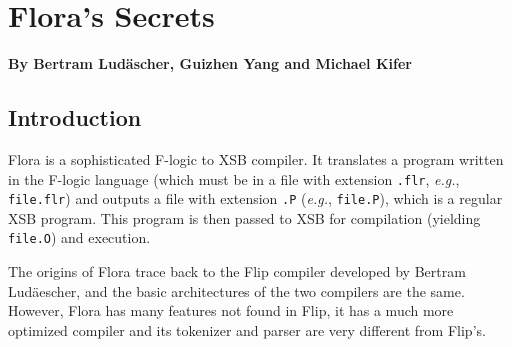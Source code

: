 \documentclass[11pt]{report}
\begin{document}
\newcommand{\FdConstr}{\ensuremath{\stackrel{constr}{\Fd}}}
\newcommand{\MvdConstr}{\ensuremath{\stackrel{constr}{\Mvd}}}

\newlength{\flogicindent}


\newlength{\flength}
\newlength{\counterlength}


\newcommand{\la}{\ensuremath{\,\leftarrow\,}}

\newcommand{\anon}{\_}

\newcommand{\note}[1]{\textit{[[#1]]}}
\newcommand{\nterm}[1]{\ensuremath{\langle}\textit{#1}\ensuremath{\rangle}}



\newcommand{\bs}{\ensuremath{\backslash}}
\newcommand{\FLIP}{{\mbox{\sc Flip}}\xspace}
\newcommand{\FLORA}{{\mbox{\sc Flora}}\xspace}
\newcommand{\FLORID}{{\mbox{\sc Florid}}\xspace}
\newcommand{\fl}{{F-logic}\xspace}


\newcommand{\consts}{\ensuremath{\mathcal{C}}}
\newcommand{\funcs}{\ensuremath{\mathcal{F}}}
\newcommand{\preds}{\ensuremath{\mathcal{P}}}
\newcommand{\vars}{\ensuremath{\mathcal{V}}}

\newcommand{\HU}{\ensuremath{U}}
\newcommand{\HB}{\ensuremath{\mathcal{HB}}}
\newcommand{\ext}{\ensuremath{^{\star}}}

\newcommand{\bksl}{\symbol{92}}
\newcommand{\dq}{\symbol{34}}


\chapter{\FLORA's Secrets}

\begin{center}
{\Large {\bf By Bertram Lud\"ascher, Guizhen Yang and Michael Kifer}}
\end{center}

\section{Introduction}

\FLORA is a sophisticated F-logic to XSB compiler. It translates a program
written in the F-logic language \cite{KLW95} (which must be in a file with
extension {\tt .flr}, {\it e.g.}, {\tt file.flr}) and outputs a file with
extension {\tt .P} ({\it e.g.}, {\tt file.P}), which is a regular XSB
program. This program is then passed to XSB for compilation (yielding {\tt
  file.O}) and execution.

The origins of \FLORA trace back to the \FLIP compiler developed by Bertram
Lud\"aescher, and the basic architectures of the two compilers are the same.
However, \FLORA has many features not found in \FLIP, it has a much more
optimized compiler and its tokenizer and parser are very different from
\FLIP's.
\end{document}
